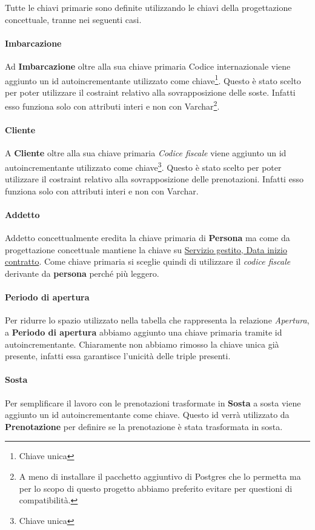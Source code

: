 Tutte le chiavi primarie sono definite utilizzando le chiavi della progettazione concettuale, tranne nei seguenti casi.

\paragraph{Imbarcazione} Ad \textbf{Imbarcazione} oltre alla sua chiave primaria Codice internazionale viene aggiunto un id autoincrementante utilizzato come chiave\footnote{Chiave unica}. Questo è stato scelto per poter utilizzare il costraint relativo alla sovrapposizione delle soste. Infatti esso funziona solo con attributi interi e non con Varchar\footnote{A meno di installare il pacchetto aggiuntivo di Postgres che lo permetta ma per lo scopo di questo progetto abbiamo preferito evitare per questioni di compatibilità.}.

\paragraph{Cliente} A \textbf{Cliente} oltre alla sua chiave primaria \textit{Codice fiscale} viene aggiunto un id autoincrementante utilizzato come chiave\footnote{Chiave unica}. Questo è stato scelto per poter utilizzare il costraint relativo alla sovrapposizione delle prenotazioni. Infatti esso funziona solo con attributi interi e non con Varchar.

\paragraph{Addetto} Addetto concettualmente eredita la chiave primaria di \textbf{Persona} ma come da progettazione concettuale mantiene la chiave su \underline{Servizio gestito, Data inizio contratto}. Come chiave primaria si sceglie quindi di utilizzare il \textit{codice fiscale} derivante da \textbf{persona} perché più leggero.

\paragraph{Periodo di apertura} Per ridurre lo spazio utilizzato nella tabella che rappresenta la relazione \textit{Apertura}, a \textbf{Periodo di apertura} abbiamo aggiunto una chiave primaria tramite id autoincrementante. Chiaramente non abbiamo rimosso la chiave unica già presente, infatti essa garantisce l'unicità delle triple presenti.

\paragraph{Sosta} Per semplificare il lavoro con le prenotazioni trasformate in \textbf{Sosta} a sosta viene aggiunto un id autoincrementante come chiave. Questo id verrà utilizzato da \textbf{Prenotazione} per definire se la prenotazione è stata trasformata in sosta.


